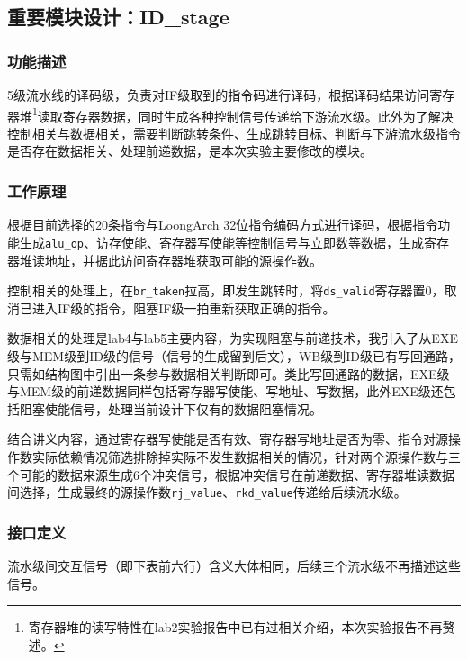 \documentclass[UTF-8,twoside,c5size]{ctexart}
\begin{document}
	\subsection{重要模块设计：ID\_stage}
	\subsubsection{功能描述}
	
	5级流水线的译码级，负责对IF级取到的指令码进行译码，根据译码结果访问寄存器堆\footnote{寄存器堆的读写特性在lab2实验报告中已有过相关介绍，本次实验报告不再赘述。}读取寄存器数据，同时生成各种控制信号传递给下游流水级。此外为了解决控制相关与数据相关，需要判断跳转条件、生成跳转目标、判断与下游流水级指令是否存在数据相关、处理前递数据，是本次实验主要修改的模块。
	
	\subsubsection{工作原理}
	
	根据目前选择的20条指令与LoongArch 32位指令编码方式进行译码，根据指令功能生成\texttt{alu\_op}、访存使能、寄存器写使能等控制信号与立即数等数据，生成寄存器堆读地址，并据此访问寄存器堆获取可能的源操作数。
	
	控制相关的处理上，在\texttt{br\_taken}拉高，即发生跳转时，将\texttt{ds\_valid}寄存器置0，取消已进入IF级的指令，阻塞IF级一拍重新获取正确的指令。
	
	数据相关的处理是lab4与lab5主要内容，为实现阻塞与前递技术，我引入了从EXE级与MEM级到ID级的信号（信号的生成留到后文），WB级到ID级已有写回通路，只需如结构图中引出一条参与数据相关判断即可。类比写回通路的数据，EXE级与MEM级的前递数据同样包括寄存器写使能、写地址、写数据，此外EXE级还包括阻塞使能信号，处理当前设计下仅有的数据阻塞情况。
	
	结合讲义内容，通过寄存器写使能是否有效、寄存器写地址是否为零、指令对源操作数实际依赖情况筛选排除掉实际不发生数据相关的情况，针对两个源操作数与三个可能的数据来源生成6个冲突信号，根据冲突信号在前递数据、寄存器堆读数据间选择，生成最终的源操作数\texttt{rj\_value}、\texttt{rkd\_value}传递给后续流水级。
	
	\subsubsection{接口定义}
	
	流水级间交互信号（即下表前六行）含义大体相同，后续三个流水级不再描述这些信号。
	
\end{document}
